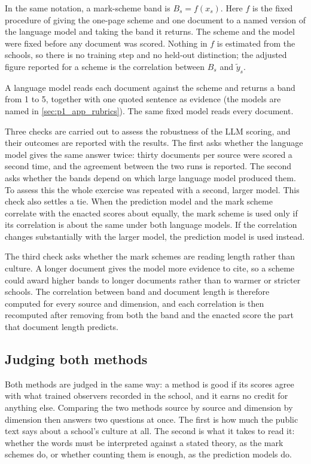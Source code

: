 In the same notation, a mark-scheme band is $B_s = f(x_s)$. Here $f$ is the fixed procedure of giving the one-page scheme and one document to a named version of the language model and taking the band it returns. The scheme and the model were fixed before any document was scored. Nothing in $f$ is estimated from the schools, so there is no training step and no held-out distinction; the adjusted figure reported for a scheme is the correlation between $B_s$ and $\tilde{y}_s$.

A language model reads each document against the scheme and returns a band from 1 to 5, together
with one quoted sentence as
evidence (the models are named in \cref{sec:p1_app_rubrics}). The
same fixed model reads every document.

Three checks are carried out to assess the robustness of the LLM scoring, and their outcomes
are reported with the results. The first asks whether the language model gives the same answer
twice: thirty documents per source were scored a second time, and the agreement between the two
runs is reported. The second asks whether the bands depend on which large language model produced them. To assess this the whole exercise was repeated with a second, larger model. This
check also settles a tie. When the prediction model and the mark scheme correlate with the enacted scores about equally, the mark scheme is used only if its correlation is about the same under both language models. If the correlation changes substantially with the larger model, the prediction model is used instead.

The third check asks whether the mark schemes are reading length rather than culture. A longer document
gives the model more evidence to cite, so a scheme could award higher bands to longer documents
rather than to warmer or stricter schools. The correlation between band and document length is
therefore computed for every source and dimension, and each correlation is then recomputed after removing from both the band and the enacted score the part that document length predicts.

\subsection{Judging both methods}
\label{sec:p1_judging}

Both methods are judged in the same way: a method is good if its scores agree with what
trained observers recorded in the school, and it earns no credit for anything else.
Comparing the two methods source by source and dimension by dimension then answers two questions
at once. The first is how much the public text says about a school's culture at all. The second
is what it takes to read it: whether the words must be interpreted against a stated theory, as
the mark schemes do, or whether counting them is enough, as the prediction models do.

